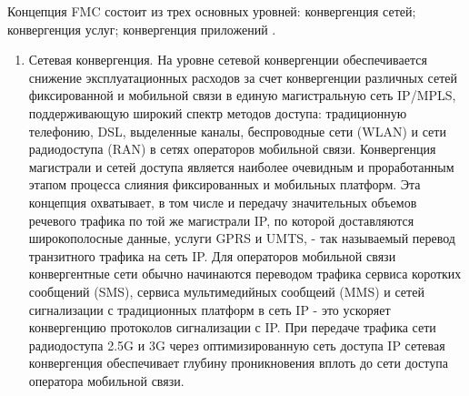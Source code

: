 Концепция FMC состоит из трех основных уровней: конвергенция сетей; конвергенция услуг; конвергенция приложений \cite{IMS}.
\begin{enumerate}
\item Сетевая конвергенция. На уровне сетевой конвергенции обеспечивается снижение эксплуатационных расходов за счет конвергенции различных сетей фиксированной и мобильной связи в единую магистральную сеть IP/MPLS, поддерживающую широкий спектр методов доступа: традиционную телефонию, DSL, выделенные каналы, беспроводные сети (WLAN) и сети радиодоступа (RAN) в сетях операторов мобильной связи.
Конвергенция магистрали и сетей доступа является наиболее очевидным и проработанным этапом процесса слияния фиксированных и мобильных платформ.
Эта концепция охватывает, в том числе и передачу значительных объемов речевого трафика по той же магистрали IP, по которой доставляются широкополосные данные, услуги GPRS и UMTS, - так называемый перевод транзитного трафика на сеть IP. 
Для операторов мобильной связи конвергентные сети обычно начинаются переводом трафика сервиса коротких сообщений (SMS), сервиса мультимедийных сообщеий (MMS) и сетей сигнализации с традиционных платформ в сеть IP - это ускоряет конвергенцию протоколов сигнализации с IP. При передаче трафика сети радиодоступа 2.5G и 3G через оптимизированную сеть доступа IP сетевая конвергенция обеспечивает глубину проникновения вплоть до сети доступа оператора мобильной связи.



\end{enumerate}
